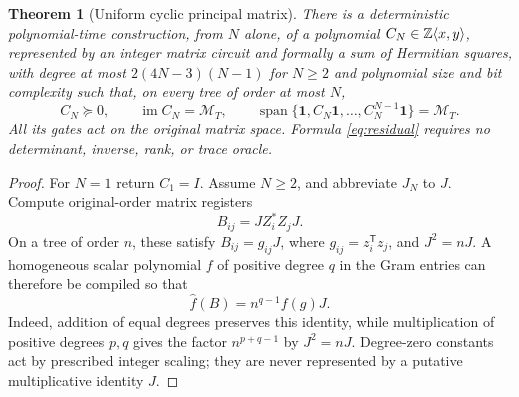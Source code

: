 \documentclass[11pt,letterpaper]{article}
\newtheorem{theorem}{Theorem}[section]
\theoremstyle{definition}\newtheorem{definition}[theorem]{Definition}
\theoremstyle{remark}\newtheorem{remark}[theorem]{Remark}
\DeclareMathOperator{\spanop}{span}\DeclareMathOperator{\im}{im}
\newcommand{\one}{\mathbf1}\newcommand{\M}{\mathcal M}
\begin{document}
\begin{theorem}[Uniform cyclic principal matrix]\label{thm:uniformcyclic}
There is a deterministic polynomial-time construction, from $N$ alone, of a polynomial $C_N\in\mathbb Z\langle x,y\rangle$, represented by an integer matrix circuit and formally a sum of Hermitian squares, with degree at most $2(4N-3)(N-1)$ for $N\ge2$ and polynomial size and bit complexity such that, on every tree of order at most $N$,
\[
C_N\succeq0,\qquad \im C_N=\M_T,
\qquad \spanop\{\one,C_N\one,\ldots,C_N^{N-1}\one\}=\M_T.
\]
All its gates act on the original matrix space. Formula \eqref{eq:residual} requires no determinant, inverse, rank, or trace oracle.
\end{theorem}
\begin{proof}
For $N=1$ return $C_1=I$. Assume $N\ge2$, and abbreviate $J_N$ to $J$. Compute original-order matrix registers
\[
B_{ij}=JZ_i^*Z_jJ.
\]
On a tree of order $n$, these satisfy $B_{ij}=g_{ij}J$, where $g_{ij}=z_i^{\mathsf T}z_j$, and $J^2=nJ$. A homogeneous scalar polynomial $f$ of positive degree $q$ in the Gram entries can therefore be compiled so that
\begin{equation}\label{eq:homogeneous-lift}
\widehat f(B)=n^{q-1}f(g)J.
\end{equation}
Indeed, addition of equal degrees preserves this identity, while multiplication of positive degrees $p,q$ gives the factor $n^{p+q-1}$ by $J^2=nJ$. Degree-zero constants act by prescribed integer scaling; they are never represented by a putative multiplicative identity $J$.


\end{proof}
\end{document}
